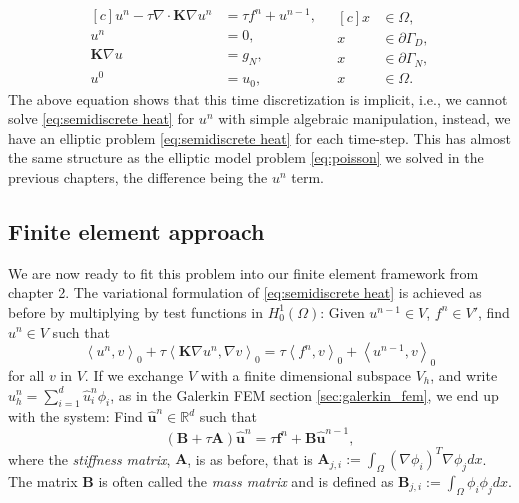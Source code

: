 \documentclass[../Main/main.tex]{subfiles}
\begin{document}
	\begin{equation}\label{eq:semidiscrete heat}
		\begin{aligned}[c]
			u^n - \tau \nabla \cdot \bm{K} \nabla u^n &= \tau f^n+u^{n-1},\\
			u^n &= 0, \\
			\bm{K}\nabla u &= g_N,\\
			u^0 &= u_0,
		\end{aligned}
		\ \ \
		\begin{aligned}[c]
			x &\in \Omega,  \\
			x &\in \partial \Gamma_D, \\
			x &\in \partial \Gamma_N, \\
			x &\in \Omega .
		\end{aligned}
	\end{equation}
	The above equation shows that this time discretization is implicit, i.e., we cannot solve \eqref{eq:semidiscrete heat} for $u^n$ with simple algebraic manipulation,
	instead, we have an elliptic problem \eqref{eq:semidiscrete heat} for each time-step. This has almost the same structure as the elliptic model problem \eqref{eq:poisson} we solved in the previous chapters, the difference being the $u^n$ term.
	\subsection*{Finite element approach}
	We are now ready to fit this problem into our finite element framework from chapter 2.
	The variational formulation of \eqref{eq:semidiscrete heat} is achieved as before by multiplying by test functions in $H^1_0(\Omega)$: Given $u^{n-1} \in V$, $f^n \in V'$, find $u^n \in V$ such that
	\begin{equation}
			\left \langle  u^n, v\right \rangle_0 + \tau \left \langle  \bm{K} \nabla u^n, \nabla v \right \rangle_0 =\tau \left \langle f^n,v\right \rangle_0 + \left \langle u^{n-1},v \right \rangle_0
	\end{equation}
	for all $v$ in $V$.
	If we exchange $V$ with  a finite dimensional subspace $V_h$, and write $u_h^n = \sum_{i = 1}^d \hat{u}_i^n \phi_i $, as in the Galerkin FEM section \ref{sec:galerkin_fem}, we end up with the system: Find $\hat{\bm{u}}^n\in \mathbb{R}^d$ such that 
	\begin{equation}\label{eq:heat fem disc}
			(\bm{B}+\tau\bm{A})\hat{\bm{u}}^n =\tau \bm{f}^n +  \bm{B}\hat{\bm{u}}^{n-1},
	\end{equation}
	where the \emph{stiffness matrix}, $\bm{A}$, is as before, that is $\bm{A}_{j,i} := \int_{\Omega}(\nabla \phi_i)^T \nabla \phi_jdx$. The matrix $\bm{B}$ is often called the \emph{mass matrix} and is defined as $\bm{B}_{j,i} := \int_{\Omega} \phi_i \phi_jdx$.
\end{document}
